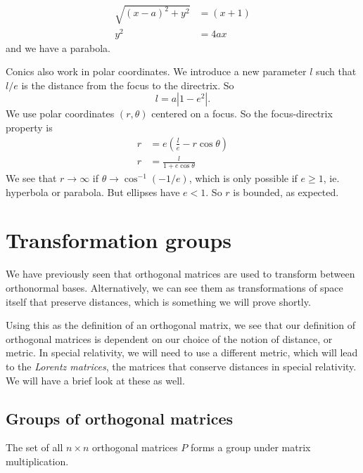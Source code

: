 \documentclass[a4paper]{article}
\begin{document}
\begin{enumerate}
\begin{center}
    \end{center}
    \begin{align*}
      \sqrt{(x - a)^2 + y^2} &= (x + 1)\\
      y^2 &= 4ax
    \end{align*}
    and we have a parabola.
\end{enumerate}

Conics also work in polar coordinates. We introduce a new parameter $l$ such that $l/e$ is the distance from the focus to the directrix. So
\[
  l = a|1 - e^2|.
\]
We use polar coordinates $(r, \theta)$ centered on a focus. So the focus-directrix property is
\begin{align*}
  r &= e\left(\frac{l}{e} - r\cos\theta\right)\\
  r &= \frac{l}{1 + e\cos\theta}
\end{align*}
We see that $r\to \infty$ if $\theta \to \cos^{-1}(-1/e)$, which is only possible if $e\geq 1$, ie. hyperbola or parabola. But ellipses have $e < 1$. So $r$ is bounded, as expected.

\section{Transformation groups}
We have previously seen that orthogonal matrices are used to transform between orthonormal bases. Alternatively, we can see them as transformations of space itself that preserve distances, which is something we will prove shortly.

Using this as the definition of an orthogonal matrix, we see that our definition of orthogonal matrices is dependent on our choice of the notion of distance, or metric. In special relativity, we will need to use a different metric, which will lead to the \emph{Lorentz matrices}, the matrices that conserve distances in special relativity. We will have a brief look at these as well.

\subsection{Groups of orthogonal matrices}
\begin{prop}
  The set of all $n\times n$ orthogonal matrices $P$ forms a group under matrix multiplication.
\end{prop}
\end{document}
